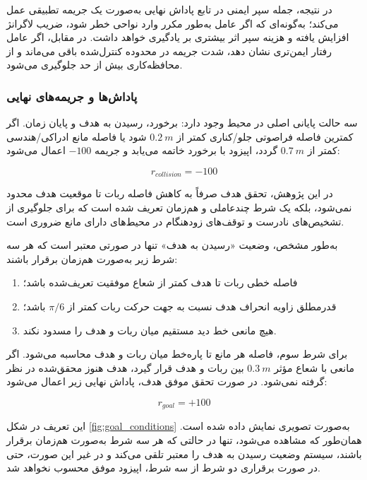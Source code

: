 در نتیجه، جمله سپر ایمنی در تابع پاداش نهایی به‌صورت یک جریمه تطبیقی عمل می‌کند؛ به‌گونه‌ای که اگر عامل به‌طور مکرر وارد نواحی خطر شود، ضریب لاگرانژ افزایش یافته و هزینه سپر اثر بیشتری بر یادگیری خواهد داشت. در مقابل، اگر عامل رفتار ایمن‌تری نشان دهد، شدت جریمه در محدوده کنترل‌شده باقی می‌ماند و از محافظه‌کاری بیش از حد جلوگیری می‌شود.

\subsubsection{پاداش‌ها و جریمه‌های نهایی}
\label{subsubsec:terminal_reward_final}

سه حالت پایانی اصلی در محیط وجود دارد: برخورد، رسیدن به هدف و پایان زمان. اگر کمترین فاصله فراصوتی جلو/کناری کمتر از \(0.2~m\) شود یا فاصله مانع ادراکی/هندسی کمتر از \(0.7~m\) گردد، اپیزود با برخورد خاتمه می‌یابد و جریمه \(-100\) اعمال می‌شود:

\begin{equation}
	r_{collision}=-100
	\label{eq:collision_penalty_final}
\end{equation}


در این پژوهش، تحقق هدف صرفاً به کاهش فاصله ربات تا موقعیت هدف محدود نمی‌شود، بلکه یک شرط چندعاملی و هم‌زمان تعریف شده است که برای جلوگیری از تشخیص‌های نادرست و توقف‌های زودهنگام در محیط‌های دارای مانع ضروری است.

به‌طور مشخص، وضعیت «رسیدن به هدف» تنها در صورتی معتبر است که هر سه شرط زیر به‌صورت هم‌زمان برقرار باشند:

\begin{enumerate}
	\item فاصله خطی ربات تا هدف کمتر از شعاع موفقیت تعریف‌شده باشد؛
	\item قدرمطلق زاویه انحراف هدف نسبت به جهت حرکت ربات کمتر از \(\pi/6\) باشد؛
	\item هیچ مانعی خط دید مستقیم میان ربات و هدف را مسدود نکند.
\end{enumerate}

برای شرط سوم، فاصله هر مانع تا پاره‌خط میان ربات و هدف محاسبه می‌شود. اگر مانعی با شعاع مؤثر \(0.3~m\) بین ربات و هدف قرار گیرد، هدف هنوز محقق‌شده در نظر گرفته نمی‌شود. در صورت تحقق موفق هدف، پاداش نهایی زیر اعمال می‌شود:

\begin{equation}
	r_{goal}=+100
	\label{eq:goal_reward_final}
\end{equation}

این تعریف در شکل \ref{fig:goal_conditions} به‌صورت تصویری نمایش داده شده است. همان‌طور که مشاهده می‌شود، تنها در حالتی که هر سه شرط به‌صورت هم‌زمان برقرار باشند، سیستم وضعیت رسیدن به هدف را معتبر تلقی می‌کند و در غیر این صورت، حتی در صورت برقراری دو شرط از سه شرط، اپیزود موفق محسوب نخواهد شد.


